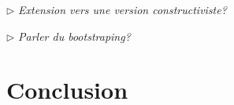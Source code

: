 \documentclass{article}
\newcommand{\remtext}[1]{\textcolor{bwgreen}{$\triangleright$ \textsl{#1}}}
\begin{document}
\remtext{Extension vers une version constructiviste?}

\remtext{Parler du bootstraping?}

\section{Conclusion}








\end{document}
